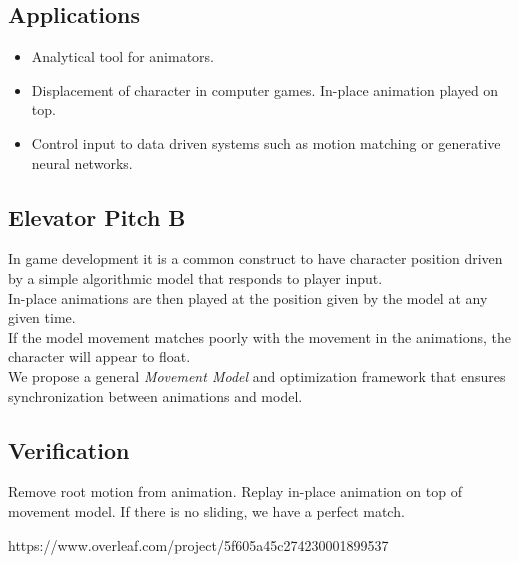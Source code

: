 \documentclass[format=acmtog]{acmart}
\begin{document}
\subsection{Applications}
\begin{itemize}
    \item Analytical tool for animators.
    \item Displacement of character in computer games. In-place animation played on top.
    \item Control input to data driven systems such as motion matching or generative neural networks.
\end{itemize}

\subsection{Elevator Pitch B}
In game development it is a common construct to have character position driven by a simple algorithmic model that responds to player input.
\\ 
In-place animations are then played at the position given by the model at any given time.
\\
If the model movement matches poorly with the movement in the animations, the character will appear to float.
\\
We propose a general \textit{Movement Model} and optimization framework that ensures synchronization between animations and model. 

\subsection{Verification}
Remove root motion from animation. Replay in-place animation on top of movement model. If there is no sliding, we have a perfect match.








https://www.overleaf.com/project/5f605a45c274230001899537





{}

\end{document}
